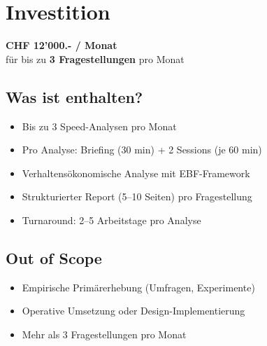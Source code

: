 \documentclass[11pt,a4paper]{article}
\begin{document}
\newpage
\section{Investition}

\begin{fainfobox}
\begin{center}
{\LARGE\textbf{CHF 12'000.- / Monat}}\\[0.5cm]
{\large für bis zu \textbf{3 Fragestellungen} pro Monat}
\end{center}
\end{fainfobox}

\vspace{0.8cm}

\subsection{Was ist enthalten?}

\begin{itemize}[leftmargin=*]
    \item[$\checkmark$] Bis zu 3 Speed-Analysen pro Monat
    \item[$\checkmark$] Pro Analyse: Briefing (30 min) + 2 Sessions (je 60 min)
    \item[$\checkmark$] Verhaltensökonomische Analyse mit EBF-Framework
    \item[$\checkmark$] Strukturierter Report (5--10 Seiten) pro Fragestellung
    \item[$\checkmark$] Turnaround: 2--5 Arbeitstage pro Analyse
\end{itemize}

\vspace{0.5cm}

\subsection{Out of Scope}

\begin{itemize}[leftmargin=*]
    \item[$\times$] Empirische Primärerhebung (Umfragen, Experimente)
    \item[$\times$] Operative Umsetzung oder Design-Implementierung
    \item[$\times$] Mehr als 3 Fragestellungen pro Monat
\end{itemize}
\end{document}
